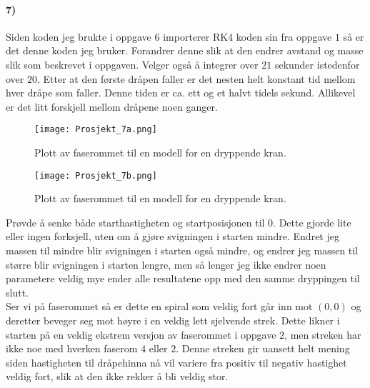 \documentclass[11pt, A4paper,norsk]{article}
\begin{document}
		\paragraph{7)}
			\begin{flushleft}
Siden koden jeg brukte i oppgave $6$ importerer RK4 koden sin fra oppgave $1$ så er det denne koden jeg bruker. Forandrer denne slik at den endrer avstand og masse slik som beskrevet i oppgaven. Velger også å integrer over $21$ sekunder istedenfor over $20$. Etter at den første dråpen faller er det nesten helt konstant tid mellom hver dråpe som faller. Denne tiden er ca. ett og et halvt tidels sekund. Allikevel er det litt forskjell mellom dråpene noen ganger.
			\end{flushleft}
			\begin{figure}[H]
\texttt{[image: Prosjekt\_7a.png]}
\caption{Plott av faserommet til en modell for en dryppende kran.}
\label{7a}
			\end{figure}
			\begin{figure}[H]
\texttt{[image: Prosjekt\_7b.png]}
\caption{Plott av faserommet til en modell for en dryppende kran.}
\label{7b}
			\end{figure}
			\begin{flushleft}
Prøvde å senke både starthastigheten og startposisjonen til $0$. Dette gjorde lite eller ingen forksjell, uten om å gjøre svigningen i starten mindre. Endret jeg massen til mindre blir svigningen i starten også mindre, og endrer jeg massen til større blir svigningen i starten lengre, men så lenger jeg ikke endrer noen parametere veldig mye ender alle resultatene opp med den samme dryppingen til slutt. \\

Ser vi på faserommet så er dette en spiral som veldig fort går inn mot $(0, 0)$ og deretter beveger seg mot høyre i en veldig lett sjelvende strek. Dette likner i starten på en veldig ekstrem versjon av faserommet i oppgave $2$, men streken har ikke noe med hverken faserom $4$ eller $2$. Denne streken gir uansett helt mening siden hastigheten til dråpehinna nå vil variere fra positiv til negativ hastighet veldig fort, slik at den ikke rekker å bli veldig stor. 
			\end{flushleft}
\end{document}

